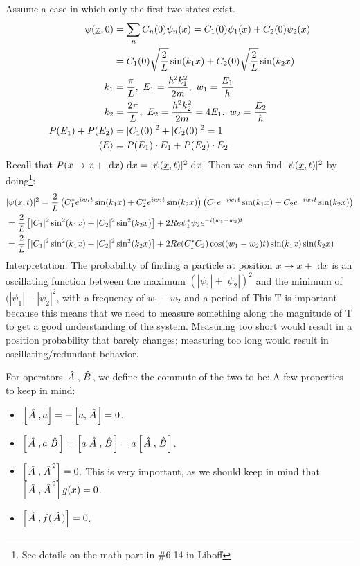 \documentclass{school-22.101-notes}
\begin{document}
Assume a case in which only the first two states exist. 
\begin{align}
\psi(\underline{x}, 0) &= \displaystyle\sum_n C_n (0) \psi_n(x)  = C_1 (0) \psi_1 (x) + C_2 (0) \psi_2 (x) \\
&= C_1 (0) \sqrt{\frac{2}{L}} \sin (k_1 x) + C_2 (0) \sqrt{\frac{2}{L}} \sin (k_2 x) \\
k_1 &= \frac{\pi}{L}, \mbox{ } E_1 = \frac{\hbar^2 k_1^2}{2m}, \mbox{ } w_1 = \frac{E_1}{\hbar} \\
k_2 &= \frac{2\pi}{L}, \mbox{ } E_2 = \frac{\hbar^2 k_2^2}{2m} = 4 E_1, \mbox{ } w_2 = \frac{E_2}{\hbar} \\
P(E_1) + P(E_2) &= |C_1 (0)|^2 + |C_2(0)|^2 = 1 \\
\left< E \right>  &=  P(E_1) \cdot E_1 + P(E_2) \cdot E_2
\end{align}
Recall that $P(x \to x+\mbox{ }\mathrm{d} x) \mbox{ }\mathrm{d} x = |\psi(\underline{x}, t)|^2 \mbox{ }\mathrm{d} x$. Then we can find $|\psi(\underline{x}, t)|^2$ by doing\footnote{See details on the math part in \#6.14 in Liboff}: 
\begin{align}
&|\psi(\underline{x}, t)|^2 = \frac{2}{L} \left( C_1^* e^{i w_1 t} \sin (k_1 x) + C_2^* e^{i w_2 t} \sin(k_2 x) \right) \left( C_1 e^{-i w_1 t} \sin (k_1 x) + C_2 e^{-i w_2 t} \sin(k_2 x) \right) \\
&= \frac{2}{L} \left[ |C_1|^2 \sin^2 (k_1 x) + |C_2|^2 \sin^2 (k_2 x) \right] + 2 Re \psi_1^* \psi_2 e^{-i(w_1 - w_2)t} \\
&= \frac{2}{L} \left[ |C_1|^2 \sin^2 (k_1 x) + |C_2|^2 \sin^2 (k_2 x) \right] + 2 Re(C_1^* C_2) \cos ((w_1 - w_2)t) \sin (k_1 x) \sin(k_2 x) 
\end{align}
Interpretation: 
The probability of finding a particle at position $x \to x + \mbox{ }\mathrm{d} x$ is an oscillating function between the maximum $(|\psi_1| + |\psi_2|)^2$ and the minimum of $(|\psi_1| - |\psi_2|^2$, with a frequency of $w_1 - w_2$ and a period of 
This T is important because this means that we need to measure something along the magnitude of T to get a good understanding of the system. Measuring too short would result in a position probability that barely changes; measuring too long would result in oscillating/redundant behavior.

For operators $\left. \hat{A} \right., \left. \hat{B} \right.$, we define the commute of the two to be:
A few properties to keep in mind:
\begin{itemize}
\item $ \left[ \left. \hat{A} \right., a \right] = - \left[ a, \left. \hat{A} \right. \right] = 0 $. 
\item $ \left[ \left. \hat{A} \right., a \left. \hat{B} \right. \right] = \left[ a \left. \hat{A} \right., \left. \hat{B} \right. \right] = a \left[ \left. \hat{A} \right., \left. \hat{B} \right. \right]$.
\item $ \left[ \left. \hat{A} \right., \left. \hat{A} \right.^2 \right] = 0 $. 
This is very important, as we should keep in mind that $\left[ \left. \hat{A} \right., \left. \hat{A} \right.^2 \right] g(x) = 0$. 
\item $ \left[ \left. \hat{A} \right., f(\left. \hat{A} \right.) \right] = 0$. 
\end{itemize}
\end{document}
